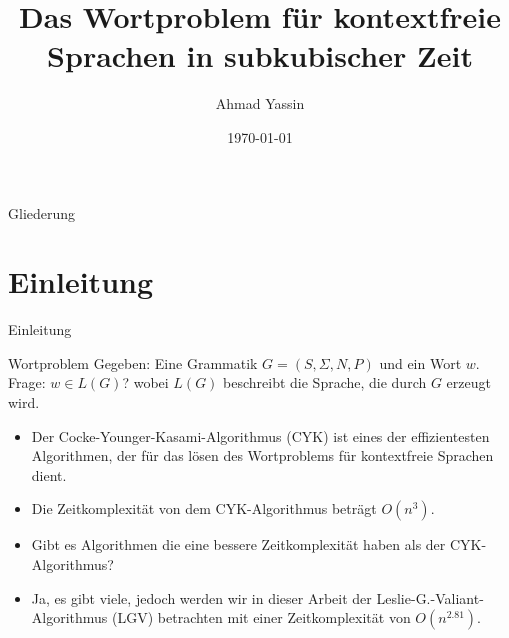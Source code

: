 \documentclass{beamer}
\title[Bachelorarbeit] %
{Das Wortproblem für kontextfreie Sprachen in subkubischer Zeit}
\author[] %
{Ahmad Yassin}
\institute[] %
{
	Bachelorarbeit\\
}
\date\today
\begin{document}
	
	\frame{\titlepage}
	\begin{frame}{Gliederung}
		\tableofcontents
	\end{frame}
	
	
	
	
	\section{Einleitung}
	
	
	\begin{frame}{Einleitung}
		\begin{block}{Wortproblem}
			Gegeben: Eine Grammatik $G = (S, \Sigma, N, P)$ und ein Wort $w$.
			\\Frage: $w \in L(G)$? wobei $L(G)$ beschreibt die Sprache, die durch $G$ erzeugt wird.
		\end{block}
		\pause
		\begin{itemize}
		\item Der Cocke-Younger-Kasami-Algorithmus (CYK) ist eines der effizientesten Algorithmen, der für das lösen des Wortproblems für kontextfreie Sprachen dient.\\
		\pause
		\item Die Zeitkomplexität von dem CYK-Algorithmus beträgt  $O(n^{3})$.\\
		\pause
		\item Gibt es Algorithmen die eine bessere Zeitkomplexität haben als der CYK-Algorithmus?\\
		\pause
		\item Ja, es gibt viele, jedoch werden wir in dieser Arbeit der Leslie-G.-Valiant-Algorithmus (LGV) betrachten mit einer Zeitkomplexität von $O(n^{2.81})$.
		\end{itemize}
	\end{frame}
\end{document}
